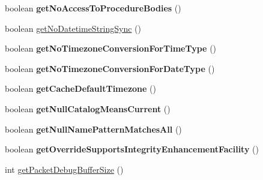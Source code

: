 \begin{DoxyCompactItemize}
boolean {\bfseries get\+No\+Access\+To\+Procedure\+Bodies} ()
\item 
boolean \mbox{\hyperlink{classcom_1_1mysql_1_1jdbc_1_1_multi_host_my_s_q_l_connection_a6b3c51428efc616f8a08b2e5c70b75cd}{get\+No\+Datetime\+String\+Sync}} ()
\item 
\mbox{\label{classcom_1_1mysql_1_1jdbc_1_1_multi_host_my_s_q_l_connection_a05aba13c7d286ae386d25be80d746649}} 
boolean {\bfseries get\+No\+Timezone\+Conversion\+For\+Time\+Type} ()
\item 
\mbox{\label{classcom_1_1mysql_1_1jdbc_1_1_multi_host_my_s_q_l_connection_a14f41438a95a9ec96359d821d5980ba9}} 
boolean {\bfseries get\+No\+Timezone\+Conversion\+For\+Date\+Type} ()
\item 
\mbox{\label{classcom_1_1mysql_1_1jdbc_1_1_multi_host_my_s_q_l_connection_ad9c092e19e41cb97eb0e6e833878b1d6}} 
boolean {\bfseries get\+Cache\+Default\+Timezone} ()
\item 
\mbox{\label{classcom_1_1mysql_1_1jdbc_1_1_multi_host_my_s_q_l_connection_accd5cece6251ef8bfba969e3e446dcc1}} 
boolean {\bfseries get\+Null\+Catalog\+Means\+Current} ()
\item 
\mbox{\label{classcom_1_1mysql_1_1jdbc_1_1_multi_host_my_s_q_l_connection_a37a2aca98e10d0d221356bdaf864260a}} 
boolean {\bfseries get\+Null\+Name\+Pattern\+Matches\+All} ()
\item 
\mbox{\label{classcom_1_1mysql_1_1jdbc_1_1_multi_host_my_s_q_l_connection_abfefc5f140de77c515033841ee3af233}} 
boolean {\bfseries get\+Override\+Supports\+Integrity\+Enhancement\+Facility} ()
\item 
int \mbox{\hyperlink{classcom_1_1mysql_1_1jdbc_1_1_multi_host_my_s_q_l_connection_a7201e5e89691f622bba29279e5e49ffb}{get\+Packet\+Debug\+Buffer\+Size}} ()
\item 
\mbox{\label{classcom_1_1mysql_1_1jdbc_1_1_multi_host_my_s_q_l_connection_a2f245e100c33f8299f791596f061b040}} 

\end{DoxyCompactItemize}

